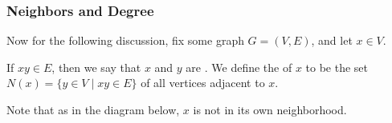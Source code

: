 \documentclass[11pt, mathserif]{beamer}
\theoremstyle{definition}
\theoremstyle{remark}
\begin{document}
\begin{frame}
  \frametitle{Neighbors and Degree}

  
Now for the following discussion, fix some graph $G = (V, E)$, and let $x \in V$. 

\vspace{2\baselineskip}

\begin{definition}[Neighborhood]
	If $xy \in E$, then we say that $x$ and $y$ are .
	We define the  of $x$ to be the set $N(x) = \{ y \in V \mid xy \in E\}$ of all vertices adjacent to $x$.
\end{definition}

Note that as in the diagram below, $x$ is not in its own neighborhood.
\begin{center}
	


\begin{tikzpicture}[x=0.75pt,y=0.75pt,yscale=-1,xscale=1]


\end{tikzpicture}
\end{center}
\end{frame}
\end{document}
